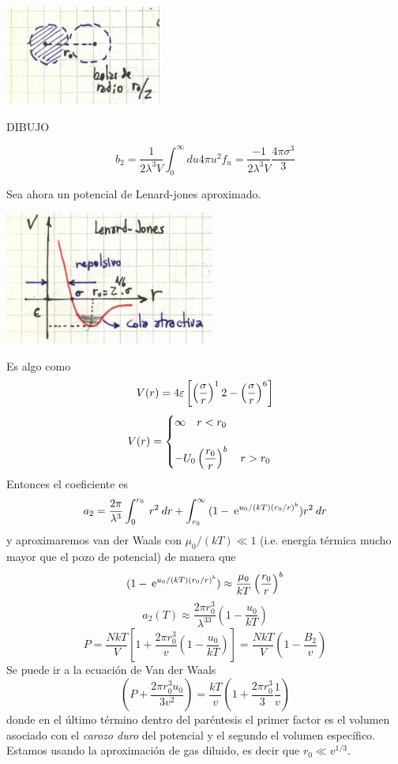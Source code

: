 \documentclass[10pt,oneside]{CBFT_book}
\begin{document}
\includegraphics[scale=0.5]{images/1606337092.jpg}

DIBUJO 

\[
	b_2 = \frac{1}{2\lambda^3 V} \int_0^\infty du 4 \pi u^2 f_u = \frac{-1}{2\lambda^3 V} \frac{4\pi\sigma^3}{3}
\]

Sea ahora un potencial de Lenard-jones aproximado.

\includegraphics[scale=0.5]{images/1606337096.jpg}

Es algo como
\[
	V(r) =  4 \varepsilon \left[ \left( \frac{  \sigma  }{ r } \right)^12 - \left( \frac{  \sigma  }{ r } \right)^6 \right]
\]
\[
	V(r) = \begin{cases}
		\infty \quad r < r_0 \\
		\\
		\displaystyle -U_0\left( \frac{ r_0 }{ r } \right)^b      \quad r > r_0
	       \end{cases}
\]
Entonces el coeficiente es
\[
	a_2 = \frac{2\pi}{\lambda^3} 
	\int_0^{r_0} \: r^2 \: dr + \int_{r_0}^\infty \: ( 1 - \:\mathrm{e}^{u_0/(kT)(r_0/r)^b} ) r^2 \: dr 
\]
y aproximaremos van der Waals con $\mu_0/(kT) \ll 1$ (i.e. energía térmica mucho mayor que el pozo de potencial)
de manera que 
\[
	( 1 -  \:\mathrm{e}^{u_0/(kT)(r_0/r)^b} ) \approx \frac{\mu_0}{kT} \left( \frac{ r_0 }{ r } \right)^b
\]
\[
	a_2(T) \approx  \frac{2\pi r_0^3}{\lambda^33} \left( 1 - \frac{u_0}{kT} \right)
\]
\[
	P = \frac{ N k T }{V} \left[ 1 + \frac{2\pi r_0^3}{v} \left( 1 - \frac{u_0}{kT} \right) \right]
	= \frac{ N k T }{V} \left( 1 - \frac{B_2}{v} \right) 
\]
Se puede ir a la ecuación de Van der Waals
\[
	 \left( P + \frac{2\pi r_0^3 u_0}{3v^2} \right) = \frac{kT}{v} \left( 1 + \frac{2\pi r_0^3}{3} \frac{1}{v} \right)
\]
donde en el último término dentro del paréntesis el primer factor es el volumen asociado con el {\it carozo duro}
del potencial y el segundo el volumen específico. Estamos usando la aproximación de gas diluido, es decir
que $ r_0 \ll v^{1/3}$.
\end{document}
